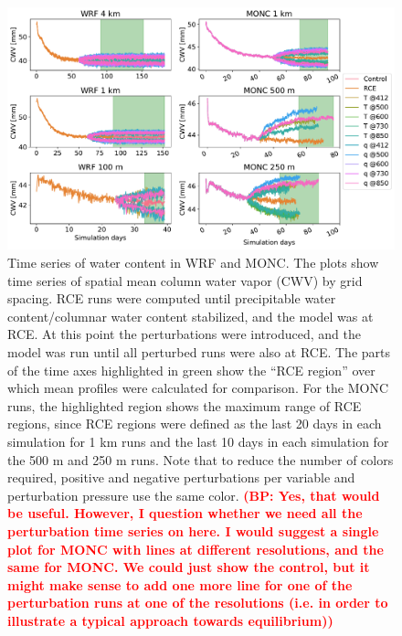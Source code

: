 \documentclass[draft]{agujournal2019}
\newcommand{\todo}[1]{\textcolor{red}{\textbf{(#1)}}}
\begin{document}
\begin{figure}[pth]
    \noindent\includegraphics[width=\textwidth]{figures/runs_timeseries.pdf}
    \caption{Time series of water content in WRF and MONC. The plots show time
    series of spatial mean column water vapor (CWV) by grid spacing. RCE runs
    were computed until precipitable water content/columnar water content
    stabilized, and the model was at RCE. At this point the perturbations were
    introduced, and the model was run until all perturbed runs were also at RCE.
    The parts of the time axes highlighted in green show the ``RCE region'' over
    which mean profiles were calculated for comparison. For the MONC runs, the
    highlighted region shows the maximum range of RCE regions, since RCE regions
    were defined as the last 20 days in each simulation for 1 km runs and the
    last 10 days in each simulation for the 500 m and 250 m runs. Note that to
    reduce the number of colors required, positive and negative perturbations
    per variable and perturbation pressure use the same color. \todo{BP: Yes,
    that would be useful. However, I question whether we need all the
    perturbation time series on here. I would suggest a single plot for MONC
    with lines at different resolutions, and the same for MONC. We could just
    show the control, but it might make sense to add one more line for one of
    the perturbation runs at one of the resolutions (i.e. in order to illustrate
    a typical approach towards equilibrium)}}
    \label{fig:rce_pw}
\end{figure}
\end{document}
